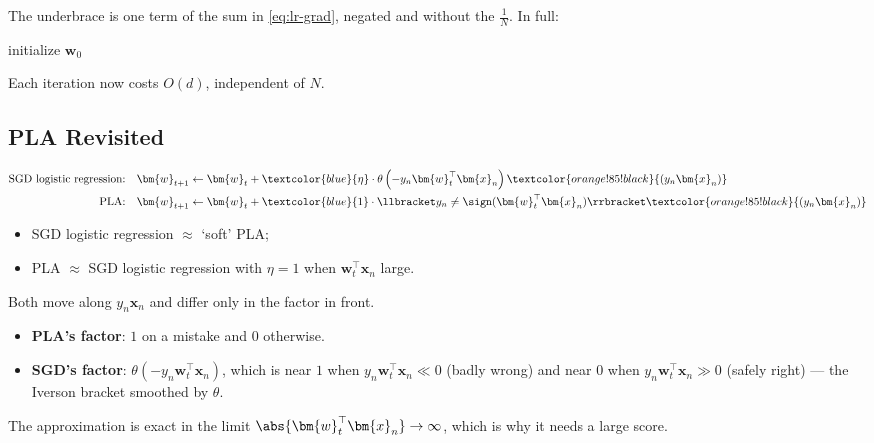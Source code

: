 The underbrace is one term of the sum in \eqref{eq:lr-grad}, negated and
without the \(\frac{1}{N}\). In full:

\begin{algorithm}[H]
    \caption{SGD Logistic Regression}\label{alg:sgd-logreg}
    initialize \(\bm{w}_0\)\;
\end{algorithm}

Each iteration now costs \(O(d)\), independent of \(N\).

\subsection{PLA Revisited}

\begin{align*}
    \text{SGD logistic regression:} \quad
    \bm{w}_{t+1} &\gets \bm{w}_t + \textcolor{blue}{\eta} \cdot \theta \left(
    -y_n \bm{w}_t^\top \bm{x}_n \right)
    \textcolor{orange!85!black}{\left( y_n \bm{x}_n \right)}\\
    \text{PLA:} \quad
    \bm{w}_{t+1} &\gets \bm{w}_t + \textcolor{blue}{1} \cdot \llbracket y_n
    \neq \sign(\bm{w}_t^\top \bm{x}_n) \rrbracket
    \textcolor{orange!85!black}{\left( y_n \bm{x}_n \right)}
\end{align*}

\begin{moral}
    \begin{itemize}
        \item SGD logistic regression \(\approx\) `soft' PLA;
        \item PLA \(\approx\) SGD logistic regression with \(\eta = 1\) when
            \(\bm{w}_t^\top \bm{x}_n\) large.
    \end{itemize}
\end{moral}

Both move along \(y_n \bm{x}_n\) and differ only in the factor in front.
\begin{itemize}
    \item \textbf{PLA's factor}: \(1\) on a mistake and \(0\) otherwise.
    \item \textbf{SGD's factor}: \(\theta(-y_n \bm{w}_t^\top \bm{x}_n)\), which is
        near \(1\) when \(y_n \bm{w}_t^\top \bm{x}_n \ll 0\) (badly wrong) and
        near \(0\) when \(y_n \bm{w}_t^\top \bm{x}_n \gg 0\) (safely right) ---
        the Iverson bracket smoothed by \(\theta\).
\end{itemize}
The approximation is exact in the limit \(\abs{\bm{w}_t^\top \bm{x}_n} \to
\infty\), which is why it needs a large score.

